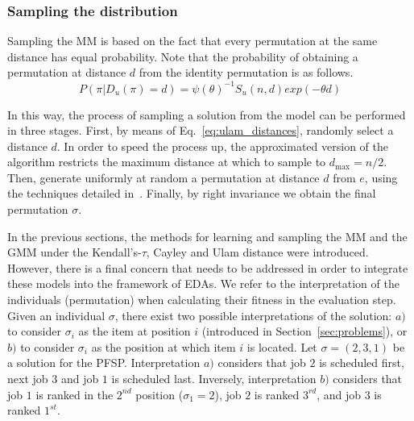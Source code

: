 \documentclass[conference]{IEEEtran}
\begin{document}

\subsubsection{Sampling the distribution}
Sampling the MM is based on the fact that every permutation at the same distance has equal probability. Note that the probability of obtaining a permutation at distance $d$ from the identity permutation is as follows.
\begin{equation}
P(\pi |  D_u(\pi)=d) = \psi( \theta)^{-1} S_u(n,d) exp(-\theta d) 
\label{eq:ulam_distances}
\end{equation}

In this way, the process of sampling a solution from the model can be performed in three stages. First, by means of Eq.~\ref{eq:ulam_distances}, randomly select a distance $d$. In order to speed the process up, the approximated version of the algorithm restricts the maximum distance at which to sample to $d_{\max} =n / 2$. Then, generate uniformly at random a permutation at distance $d$ from $e$, using the techniques detailed in~\cite{irurozki2013b}. Finally, by right invariance we obtain the final permutation $\sigma$.

\vspace{0.5cm}
In the previous sections, the methods for learning and sampling the MM and the GMM under the Kendall's-$\tau$, Cayley and Ulam distance were introduced. However, there is a final concern that needs to be addressed in order to integrate these models into the framework of EDAs. We refer to the interpretation of the individuals (permutation) when calculating their fitness in the evaluation step. Given an individual $\sigma$, there exist two possible interpretations of the solution: $a)$ to consider $\sigma_i$ as the item at position $i$ (introduced in Section~\ref{sec:problems}), or $b)$ to consider $\sigma_i$ as the position at which item $i$ is located. 
Let $\sigma=(2,3,1)$ be a solution for the PFSP.  Interpretation $a)$ considers that job $2$ is scheduled first, next job $3$ and job $1$ is scheduled last. 
Inversely, interpretation $b)$ considers that job $1$ is ranked in the $2^{nd}$ position ($\sigma_1=2$), job $2$ is ranked $3^{rd}$, and job $3$ is ranked $1^{st}$. 
\end{document}
